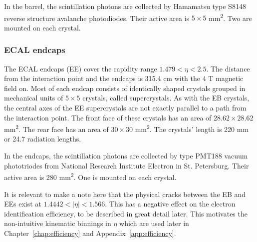In the barrel, the scintillation photons are collected by Hamamatsu type S8148 reverse structure avalanche photodiodes.
Their active area is $5\times5$ mm\textsuperscript{2}. Two are mounted on each crystal.

\subsubsection{ECAL endcaps}
The ECAL endcaps (EE) cover the rapidity range $1.479 < \eta < 2.5$.
The distance from the interaction point and the endcaps is 315.4 cm with the 4 T magnetic field on.
Most of each endcap consists of identically shaped crystals grouped in mechanical units of $5\times5$ crystals, called supercrystals.
As with the EB crystals, the central axes of the EE supercrystals are not exactly parallel to a path from the interaction point. 
The front face of these crystals has an area of $28.62\times28.62$ mm\textsuperscript{2}.
The rear face has an area of $30\times30$ mm\textsuperscript{2}.
The crystals' length is 220 mm or 24.7 radiation lengths.

In the endcaps, the scintillation photons are collected by type PMT188 vacuum phototriodes
from National Research Institute Electron in St. Petersburg.
Their active area is 280 mm\textsuperscript{2}. One is mounted on each crystal.

It is relevant to make a note here that the physical cracks between the EB and EEs exist at $1.4442 < |\eta| < 1.566$. 
This has a negative effect on the electron identification efficiency, to be described in great detail later.
This motivates the non-intuitive kinematic binnings in $\eta$ which are used later
in Chapter~\ref{chap:efficiency} and Appendix~\ref{app:efficiency}.

